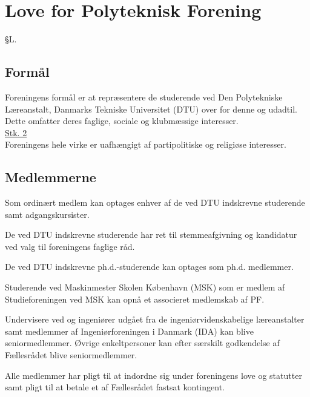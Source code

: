 \setcounter{section}{12}
\section*{Love for Polyteknisk Forening}

\begin{list}
{\S L.}{}




\subsection{Formål}\label{L:kap:Formaal}
\item Foreningens formål er at repræsentere de studerende ved Den Polytekniske Læreanstalt, Danmarks Tekniske Universitet (DTU) over for denne og udadtil. Dette omfatter deres faglige, sociale og klubmæssige interesser. \\

\underline{Stk. 2} \\
Foreningens hele virke er uafhængigt af partipolitiske og religiøse interesser.

\subsection{Medlemmerne}
\label{L:kap:medlemmerne}
\item Som ordinært medlem kan optages enhver af de ved DTU indskrevne studerende samt adgangskursister.
\item De ved DTU indskrevne studerende har ret til stemmeafgivning og kandidatur ved valg til foreningens faglige råd.
\item De ved DTU indskrevne ph.d.-studerende kan optages som ph.d. medlemmer.
\item Studerende ved Maskinmester Skolen København (MSK) som er medlem af Studieforeningen ved MSK kan opnå et associeret medlemskab af PF.
\item Undervisere ved og ingeniører udgået fra de ingeniørvidenskabelige læreanstalter samt medlemmer af         Ingeniørforeningen i Danmark (IDA) kan blive seniormedlemmer. Øvrige enkeltpersoner kan efter særskilt godkendelse af Fællesrådet blive seniormedlemmer.
\item \label{L:Medlem:Pligt} Alle medlemmer har pligt til at indordne sig under foreningens love og statutter samt pligt til at betale et af Fællesrådet fastsat kontingent.\\


\end{list}
